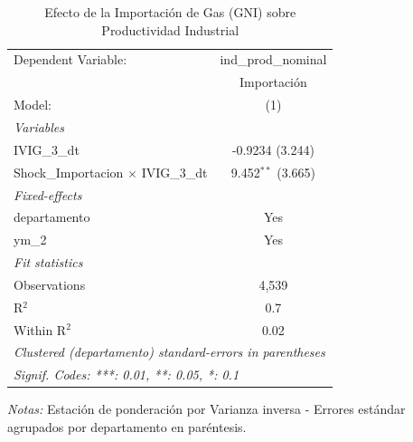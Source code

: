 \documentclass[12pt]{article}
\begin{document}
\begin{table}[htbp]
\centering
\begin{threeparttable}

   \caption{Efecto de la Importación de Gas (GNI) sobre Productividad Industrial}
   \centering
   \small
   \begin{tabular}{lc}
      \tabularnewline \midrule \midrule
      Dependent Variable:                         & ind\_prod\_nominal\\    
                                                  & Importación \\   
      Model:                                      & (1)\\  
      \midrule
      \emph{Variables}\\
      IVIG\_3\_dt                                 & -0.9234 (3.244)\\   
      Shock\_Importacion $\times$ IVIG\_3\_dt     & 9.452$^{**}$ (3.665)\\   
      \midrule
      \emph{Fixed-effects}\\
      departamento                                & Yes\\  
      ym\_2                                       & Yes\\  
      \midrule
      \emph{Fit statistics}\\
      Observations                                & 4,539\\  
      R$^2$                                       & 0.7\\  
      Within R$^2$                                & 0.02\\  
      \midrule \midrule
      \multicolumn{2}{l}{\emph{Clustered (departamento) standard-errors in parentheses}}\\
      \multicolumn{2}{l}{\emph{Signif. Codes: ***: 0.01, **: 0.05, *: 0.1}}\\
   \end{tabular}


\begin{tablenotes}
\footnotesize
\item \textit{Notas:} Estación de ponderación por Varianza inversa - Errores estándar agrupados por departamento en paréntesis.
\end{tablenotes}
\end{threeparttable}
\end{table}
\end{document}
